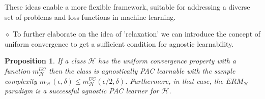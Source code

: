 \documentclass{article}
\newtheorem{proposition}[theorem]{Proposition}
\theoremstyle{remark}
\begin{document}
    These ideas enable a more flexible framework, suitable for addressing a diverse set of problems and loss functions in machine learning.

    $\diamond$ To further elaborate on the idea of 'relaxation' we can introduce the concept of uniform convergence to get a sufficient condition for agnostic learnability.

    \begin{proposition}
    If a class $\mathcal{H}$ has the uniform convergence property with a function $m^{UC}_{\mathcal{H}}$ then the class is agnostically
     PAC learnable with the sample complexity $m_{\mathcal{H}}(\epsilon,\delta)\leq m^{UC}_{\mathcal{H}}(\epsilon/2,\delta)$. Furthermore, in that case, the $ERM_{\mathcal{H}}$ paradigm is a successful 
     agnostic PAC learner for $\mathcal{H}$.
    \end{proposition}
\end{document}
